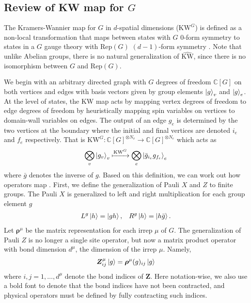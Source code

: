 \documentclass[nofootinbib,prx,twocolumn,showpacs,superscriptaddress,notitlepage,amsmath,amssymb]{revtex4-2}
\theoremstyle{definition}
\def\KW{\text{KW}}
\def\KWd{\widehat{\text{KW}}}
\def\Rep{\text{Rep}}
\def\ket#1{\mathinner{|{#1}\rangle}}
\def\bs#1{\boldsymbol{#1}}
\def\CC{\mathbb C}
\begin{document}
\subsection{Review of KW map for $G$}\label{sec:KWG}

The Kramers-Wannier map for $G$ in $d$-spatial dimensions ($\KW^G$) is defined as a non-local transformation that maps between states with $G$ $0$-form symmetry to states in a $G$ gauge theory with $\Rep(G)$ $(d-1)$-form symmetry \cite{Yoshida17, Lootens21Duality}. Note that unlike Abelian groups, there is no natural generalization of $\KWd$, since there is no isomorphism between $G$ and $\Rep(G)$.


We begin with an arbitrary directed graph with $G$ degrees of freedom $\CC[G]$ on both vertices and edges with basis vectors given by group elements $\ket{g}_v$ and $\ket{g}_e$. At the level of states, the KW map acts by mapping
vertex degrees of freedom to edge degrees of freedom by heuristically mapping
spin variables on vertices to domain-wall variables on edges. The output of an edge $g_e$ is determined by the two vertices at the boundary where the initial and final vertices are denoted $i_e$ and $f_e$ respectively. That is $\KW^G: \mathbb C[G]^{\otimes N_v} \rightarrow \mathbb C[G]^{\otimes N_e}$ which acts as 
\begin{align}
\bigotimes_v \ket{g_v}_v \xmapsto[]{\KW^G} \bigotimes_e \ket{\bar g_{i_e} g_{f_e}}_e  
\label{equ:KWonstatesG}
\end{align}
where $\bar g$ denotes the inverse of $g$. Based on this definition, we can work out how operators map . First, we define the generalization of Pauli $X$ and $Z$ to finite groups\cite{Brell2015,Albert21}. The Pauli $X$ is generalized to left and right multiplication for each group element $g$
\begin{align}
L^g \ket{h} &= \ket{gh}, & R^g\ket{h} = \ket{h\bar g}.
\end{align}
Let $\bs \rho^\mu$ be the matrix representation for each irrep $\mu$ of $G$. 
The generalization of Pauli $Z$ is no longer a single site operator, but now a matrix product operator with bond dimension $d^\mu$, the dimension of the irrep $\mu$. Namely,
\begin{align}
   \bs Z^\mu_{ij} \ket{g} = \bs  \rho^\mu(g)_{ij} \ket{g}
\end{align}
where $i,j = 1,\ldots, d^\mu$ denote the bond indices of $\bs Z$. Here notation-wise, we also use a bold font to denote that the bond indices have not been contracted, and physical operators must be defined by fully contracting such indices. 
\end{document}
